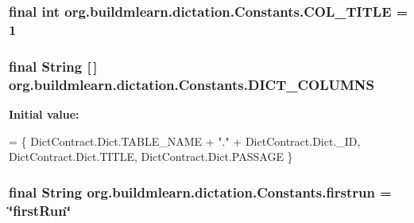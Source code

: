 \subsubsection[{\texorpdfstring{C\+O\+L\+\_\+\+T\+I\+T\+LE}{COL_TITLE}}]{\setlength{\rightskip}{0pt plus 5cm}final int org.\+buildmlearn.\+dictation.\+Constants.\+C\+O\+L\+\_\+\+T\+I\+T\+LE = 1\hspace{0.3cm}{\ttfamily [static]}}\hypertarget{classorg_1_1buildmlearn_1_1dictation_1_1Constants_a619a1b5bd4eeae6b519388971630c7b0}{}\label{classorg_1_1buildmlearn_1_1dictation_1_1Constants_a619a1b5bd4eeae6b519388971630c7b0}
\subsubsection[{\texorpdfstring{D\+I\+C\+T\+\_\+\+C\+O\+L\+U\+M\+NS}{DICT_COLUMNS}}]{\setlength{\rightskip}{0pt plus 5cm}final String \mbox{[}$\,$\mbox{]} org.\+buildmlearn.\+dictation.\+Constants.\+D\+I\+C\+T\+\_\+\+C\+O\+L\+U\+M\+NS\hspace{0.3cm}{\ttfamily [static]}}\hypertarget{classorg_1_1buildmlearn_1_1dictation_1_1Constants_af21e88e62f221e891f353a7599f4dea3}{}\label{classorg_1_1buildmlearn_1_1dictation_1_1Constants_af21e88e62f221e891f353a7599f4dea3}
{\bfseries Initial value\+:}
\begin{DoxyCode}
= \{
            DictContract.Dict.TABLE\_NAME + \textcolor{stringliteral}{"."} + DictContract.Dict.\_ID,
            DictContract.Dict.TITLE,
            DictContract.Dict.PASSAGE
    \}
\end{DoxyCode}
\subsubsection[{\texorpdfstring{firstrun}{firstrun}}]{\setlength{\rightskip}{0pt plus 5cm}final String org.\+buildmlearn.\+dictation.\+Constants.\+firstrun = \char`\"{}first\+Run\char`\"{}\hspace{0.3cm}{\ttfamily [static]}}\hypertarget{classorg_1_1buildmlearn_1_1dictation_1_1Constants_a3e78fd135b98935f0b99c03338c7e61b}{}\label{classorg_1_1buildmlearn_1_1dictation_1_1Constants_a3e78fd135b98935f0b99c03338c7e61b}
